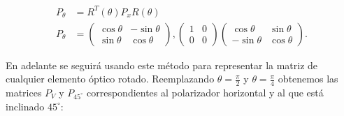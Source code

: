 \begin{align*}
P_{\theta}&=R^T(\theta)P_xR(\theta)\\
P_{\theta}
&=
\begin{pmatrix}
  \cos{\theta} &-\sin{\theta}\\\sin{\theta}&\cos{\theta}
\end{pmatrix},
\begin{pmatrix}
1 & 0 \\0& 0
\end{pmatrix}
\begin{pmatrix}
  \cos{\theta} &\sin{\theta}\\-\sin{\theta}&\cos{\theta}
\end{pmatrix}.
\end{align*}

En adelante se seguirá usando este método para representar la matriz de cualquier
elemento óptico rotado.
Reemplazando $\theta = \frac{\pi}{2}$ y $\theta = \frac{\pi}{4}$
obtenemos las matrices $P_V$ y $P_{45^{\circ}}$ correspondientes al
polarizador horizontal y al que está inclinado $45^{\circ}$:

